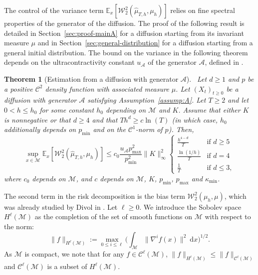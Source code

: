 \documentclass[10pt,a4paper]{article}
\newcommand\cA{\mathcal{A}}
\newcommand\cC{\mathcal{C}}
\newcommand\cM{\mathcal{M}}
\newcommand\W{\mathcal{W}}
\newcommand\dd{\mathrm{d}}
\newcommand{\SBRA}[1]{{{\left[#1\right]}}} %
\newtheorem{theorem}{Theorem}[section]
\begin{document}
The control of the variance term $\mathbb{E}_x\SBRA{\W_2^2(\widehat{\mu}_{T,h},\mu_h)}$  relies on fine spectral properties of the generator of the diffusion. The proof of the following result is detailed in Section~\ref{sec:proof-mainA} for a diffusion starting from its invariant measure $\mu$ and in Section~\ref{sec:general-distribution} for a diffusion starting from a general initial distribution. The bound on the variance in the following theorem depends on the ultracontractivity constant $u_{\cA}$ of the generator $\cA$, defined in . 
 

\begin{theorem}[Estimation from a diffusion with generator $\cA$]\
\label{thm:mainA}
Let $d\ge 1$ and $p$ be a positive $\cC^2$ density function with associated measure $\mu$.  
Let $(X_t)_{t\ge 0}$ be a diffusion with generator $\cA$ satisfying Assumption~\ref{assump:A}. Let $T\ge 2$ and let $0<h\le h_0$ for some constant $h_0$ depending on $\cM$ and $K$. Assume that either $K$ is nonnegative or that   $d\ge 4$ and that $Th^{d}\ge c\ln(T)$ (in which case, $h_0$ additionally depends on  $p_{\min}$ and on the $\cC^1$-norm of $p$). Then,
\begin{equation}
    \sup_{x\in \cM} \mathbb{E}_x\SBRA{\W_2^2(\widehat{\mu}_{T,h},\mu_h)} \le c_0 \frac{u_\cA p_{\max}^2}{p_{\min}^2} \|K\|_\infty^2 \begin{cases}
\frac{h^{4-d}}{T} &\text{if }d\ge 5\\
\frac{\ln(1/h)}T &\text{if } d=4\\
\frac{1}T &\text{if }d\le 3,
    \end{cases}
\end{equation}
where 
$c_0$ depends on $\cM$, and $c$ depends on $\cM$, $K$, $p_{\min}$, $p_{\max}$ and $\kappa_{\min}$. 
\end{theorem}




The second term in the risk decomposition is the bias term $\W_2^2(\mu_h,\mu)$, which was already studied by Divol in \cite{Divol2022}. 
Let $\ell\ge 0$. We introduce the Sobolev space $H^\ell(\cM)$ as the completion of the set of smooth functions on $\cM$ with respect to the norm: 
\[\|f\|_{H^\ell(\cM)}:= \max_{0\le i\le \ell} \Big(\int_{\cM} \|\nabla^if(x)\|^2\ \dd x\Big)^{1/2}.\]
As $\cM$ is compact, we note that for any  $f\in\cC^\ell(\cM)$, $\|f\|_{H^\ell(\cM)}\le  \|f\|_{\cC^\ell(\cM)}$ and $\cC^\ell(\cM)$ is a subset of $H^\ell(\cM)$.
\end{document}
